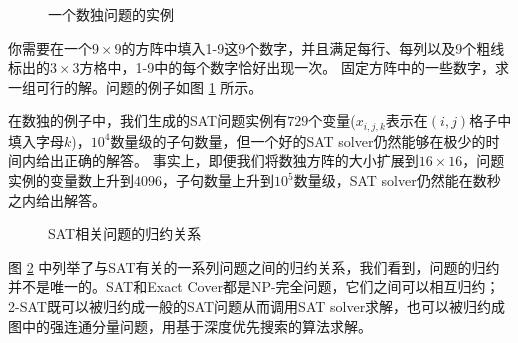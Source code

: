 \begin{figure}[h]
 \caption{一个数独问题的实例}
 \label{fig:sudoku}
\end{figure}

\begin{prob}
 你需要在一个$9\times9$的方阵中填入1-9这9个数字，并且满足每行、每列以及9个粗线标出的$3\times3$方格中，1-9中的每个数字恰好出现一次。
 固定方阵中的一些数字，求一组可行的解。问题的例子如图 \ref{fig:sudoku} 所示。
\end{prob}


在数独的例子中，我们生成的SAT问题实例有$729$个变量($x_{i,j,k}$表示在$(i,j)$格子中填入字母$k$)，$10^4$数量级的子句数量，但一个好的SAT solver仍然能够在极少的时间内给出正确的解答。
事实上，即便我们将数独方阵的大小扩展到$16\times16$，问题实例的变量数上升到$4096$，子句数量上升到$10^5$数量级，SAT solver仍然能在数秒之内给出解答。


\begin{figure}[h]
 \center
 \caption{SAT相关问题的归约关系\protect\footnotemark}
 \label{fig:sat-reduction}
\end{figure}

图 \ref{fig:sat-reduction} 中列举了与SAT有关的一系列问题之间的归约关系，我们看到，问题的归约并不是唯一的。SAT和Exact Cover都是NP-完全问题，它们之间可以相互归约；
2-SAT既可以被归约成一般的SAT问题从而调用SAT solver求解，也可以被归约成图中的强连通分量问题，用基于深度优先搜索的算法求解。
